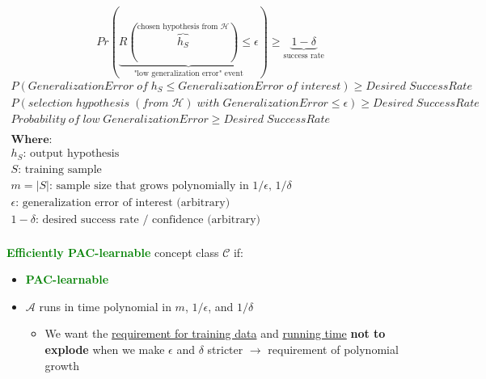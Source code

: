 \documentclass[12pt, a4paper]{article}
\begin{document}
\begin{equation} \label{eq:2}
  Pr(\underbrace{R(\overbrace{h_S}^\text{chosen hypothesis from $\mathcal{H}$}) \leq \epsilon}_\text{"low generalization error" event}) \geq \underbrace{1 - \delta}_\text{success rate}
\end{equation}
\begin{gather*}
  P(GeneralizationError\;of\;h_S \leq GeneralizationError\;of\;interest) \geq Desired\;SuccessRate \\
  P(selection\;hypothesis\;(from \; \mathcal{H})\;with\;GeneralizationError \leq \epsilon) \geq Desired\;SuccessRate \\
  Probability\;of\;low\;GeneralizationError \geq Desired\;SuccessRate \\ \\
  \textbf{Where:} \\
  \textbf{$h_S$: } \text{output hypothesis} \\
  \textbf{$S$: } \text{training sample} \\
  \textbf{$m = |S|$: } \text{sample size that grows polynomially in $1/\epsilon$, $1/\delta$} \\
  \textbf{$\epsilon$: } \text{generalization error of interest (arbitrary)} \\
  \textbf{$1-\delta$: } \text{desired success rate / confidence (arbitrary)} \\
\end{gather*}


\textbf{\textcolor{Green}{Efficiently PAC-learnable}} concept class $\mathcal{C}$ if:

\begin{itemize}
  \item
     \textbf{\textcolor{Green}{PAC-learnable}}
   \item
      $\mathcal{A}$ runs in time polynomial in $m$, $1/\epsilon$, and $1/\delta$
      \begin{itemize}
        \item We want the \uline{requirement for training data} and \uline{running time} \textbf{not to explode} when we make $\epsilon$ and $\delta$ stricter $\rightarrow$ requirement of polynomial growth
      \end{itemize}
\end{itemize}
\end{document}
